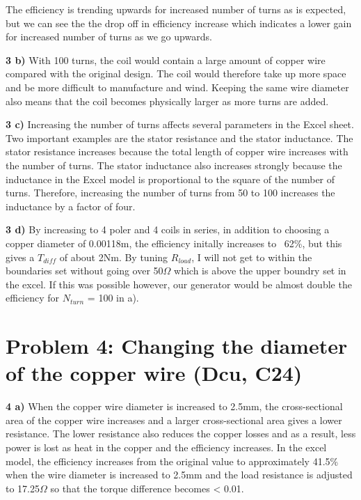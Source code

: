 \documentclass[11pt,a4paper]{article}
\begin{document}
The efficiency is trending upwards for increased number of turns as is expected, but
we can see the the drop off in efficiency increase which indicates a lower gain for
increased number of turns as we go upwards.
\newline

\textbf{3 b)}
With 100 turns, the coil would contain a large amount of copper wire compared
with the original design. The coil would therefore take up more space and be
more difficult to manufacture and wind. Keeping the same wire diameter also
means that the coil becomes physically larger as more turns are added.
\newline

\textbf{3 c)}
Increasing the number of turns affects several parameters in the Excel sheet.
Two important examples are the stator resistance and the stator inductance.
The stator resistance increases because the total length of copper wire
increases with the number of turns. The stator inductance also increases
strongly because the inductance in the Excel model is proportional to the
square of the number of turns. Therefore, increasing the number of turns
from 50 to 100 increases the inductance by a factor of four.
\newline

\textbf{3 d)}
By increasing to 4 poler and 4 coils in series, in addition to choosing
a copper diameter of 0.00118m, the efficiency initally increases to ~62\%, but
this gives a $T_{diff}$ of about 2Nm. By tuning $R_{load}$, I will not get
to within the boundaries set without going over 50$\Omega$ which is above the
upper boundry set in the excel. If this was possible however, our generator
would be almost double the efficiency for $N_{turn}$ = 100 in a).

\vspace{1.5cm}

\section*{Problem 4: Changing the diameter of the copper wire (Dcu, C24)}

\textbf{4 a)}
When the copper wire diameter is increased to 2.5mm, the cross-sectional area of the copper
wire increases and a larger cross-sectional area gives a lower resistance.
The lower resistance also reduces the copper losses and as a result, less power is lost as
heat in the copper and the efficiency increases. In the excel model, the efficiency
increases from the original value to approximately 41.5\% when the wire diameter is
increased to 2.5mm and the load resistance is adjusted to 17.25$\Omega$ so that the torque
difference becomes < 0.01.
\newline
\end{document}
